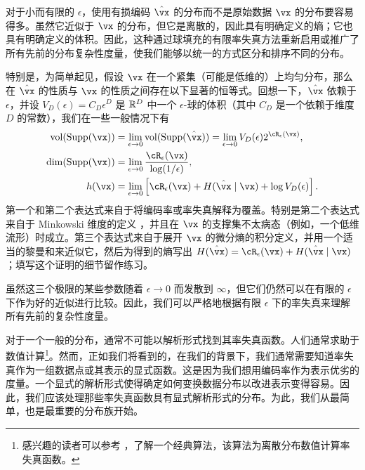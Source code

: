 \documentclass[../../book-main_zh.tex]{subfiles}
\begin{document}
\begin{remark}
	对于小而有限的 \(\epsilon\)，使用有损编码 \(\hat \vx\) 的分布而不是原始数据 \(\vx\) 的分布要容易得多。虽然它近似于 \(\vx\) 的分布，但它是离散的，因此具有明确定义的熵；它也具有明确定义的体积。因此，这种通过球填充的有限率失真方法重新启用或推广了所有先前的分布复杂性度量，使我们能够以统一的方式区分和排序不同的分布。

	特别是，为简单起见，假设 \(\vx\) 在一个紧集（可能是低维的）上均匀分布，那么在 \(\hat{\vx}\) 的性质与 \(\vx\) 的性质之间存在以下显著的恒等式。回想一下，\(\hat{\vx}\) 依赖于 \(\epsilon\)，并设 \(V_{D}(\epsilon) = C_{D}\epsilon^{D}\) 是 \(\mathbb{R}^{D}\) 中一个 \(\epsilon\)-球的体积（其中 \(C_{D}\) 是一个依赖于维度 \(D\) 的常数），我们在一些一般情况下有
	\begin{align}
		\operatorname{vol}(\Supp(\vx))
		&= \lim_{\epsilon \to 0}\operatorname{vol}(\Supp(\hat \vx)) = \lim_{\epsilon \to 0}V_{D}(\epsilon)2^{\cR_{\epsilon}(\vx)}, \\
		\dim(\Supp(\vx))
		&= \lim_{\epsilon \to 0}\frac{\cR_{\epsilon}(\vx)}{\log(1/\epsilon)}, \\
		h(\vx)
		&= \lim_{\epsilon \to 0}\bs{\cR_{\epsilon}(\vx) + H(\hat{\vx} \mid \vx) + \log V_{D}(\epsilon)}.
	\end{align}
	第一个和第二个表达式来自于将编码率或率失真解释为覆盖。特别是第二个表达式来自于 Minkowski 维度的定义 \citep{bishop2017fractals}，并且在 \(\vx\) 的支撑集不太病态（例如，一个低维流形）时成立。第三个表达式来自于展开 \(\vx\) 的微分熵的积分定义，并用一个适当的黎曼和来近似它，然后为得到的熵写出 \(H(\hat{\vx}) = \cR_{\epsilon}(\vx) + H(\hat{\vx} \mid \vx)\)；填写这个证明的细节留作练习。

	虽然这三个极限的某些参数随着 \(\epsilon \to 0\) 而发散到 \(\infty\)，但它们仍然可以在有限的 \(\epsilon\) 下作为好的近似进行比较。因此，我们可以严格地根据有限 \(\epsilon\) 下的率失真来理解所有先前的复杂性度量。
\end{remark}

对于一个一般的分布，通常不可能以解析形式找到其率失真函数。人们通常求助于数值计算\footnote{感兴趣的读者可以参考 \cite{Blahut-1972}，了解一个经典算法，该算法为离散分布数值计算率失真函数。}。然而，正如我们将看到的，在我们的背景下，我们通常需要知道率失真作为一组数据点或其表示的显式函数。这是因为我们想用编码率作为表示优劣的度量。一个显式的解析形式使得确定如何变换数据分布以改进表示变得容易。因此，我们应该处理那些率失真函数具有显式解析形式的分布。为此，我们从最简单，也是最重要的分布族开始。
\end{document}
